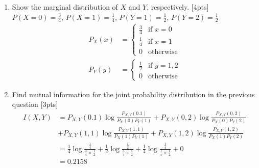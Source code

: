 \documentclass{article}
\begin{document}
\begin{enumerate}[label=(\alph*)]
\item Show the marginal distribution of $X$ and $Y$, respectively. [4pts] \newline
        $P(X=0)=\frac{3}{4}$, $P(X=1)=\frac{1}{4}$, $P(Y=1)=\frac{1}{2}$, $P(Y=2)=\frac{1}{2}$\newline\begin{align*}
            P_X(x)&=\begin{cases}
                \frac{3}{4} & \text{if } x=0 \\
                \frac{1}{4} & \text{if } x=1 \\
                0 & \text{otherwise}
            \end{cases} \\
            P_Y(y)&=\begin{cases}
                \frac{1}{2} & \text{if } y=1,2 \\
                0 & \text{otherwise}
            \end{cases}
        \end{align*}
\item Find mutual information for the joint probability distribution in the previous question [3pts]\begin{align*}
    I(X,Y)&=P_{X,Y}(0.1)\log\frac{P_{X,Y}(0.1)}{P_X(0)P_Y(1)}+P_{X,Y}(0,2)\log\frac{P_{X,Y}(0,2)}{P_X(0)P_Y(2)} \\
    &+P_{X,Y}(1,1)\log\frac{P_{X,Y}(1,1)}{P_X(1)P_Y(1)}+P_{X,Y}(1,2)\log\frac{P_{X,Y}(1,2)}{P_X(1)P_Y(2)} \\
    &=\frac{1}{4}\log\frac{\frac{1}{4}}{\frac{3}{4}\times\frac{1}{2}}+\frac{1}{2}\log\frac{\frac{1}{2}}{\frac{3}{4}\times\frac{1}{2}}+\frac{1}{4}\log\frac{\frac{1}{4}}{\frac{1}{4}\times\frac{1}{2}}+0 \\
    &=0.2158
\end{align*}
\end{enumerate}
\end{document}

